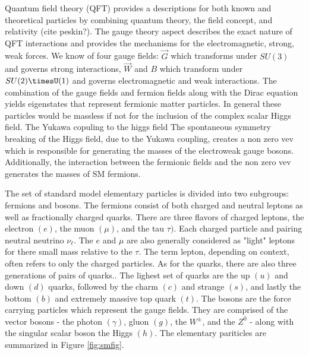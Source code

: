 Quantum field theory (QFT) provides a descriptions for both known and theoretical particles by combining quantum theory, the field concept, and relativity (cite peskin?). The gauge theory aspect describes the exact nature of QFT interactions and provides the mechanisms for the electromagnetic, strong, weak forces.  We know of four gauge fields:  $\vec{G}$ which transforms under $SU(3)$ and governs strong interactions, $\vec{W}$ and $B$ which transform under $SU(2)\timesU(1)$ and governs electromagnetic and weak interactions. The combination of the gauge fields and fermion fields along with the Dirac equation yields eigenstates that represent fermionic matter particles. In general these particles would be massless if not for the inclusion of the complex scalar Higgs field. The Yukawa copuling to the higgs field
The spontaneous symmetry breaking of the Higgs field, due to the Yukawa coupling, creates a non zero vev which is responsible for generating the masses of the electroweak gauge bosons. Additionally, the interaction between the fermionic fields and the non zero vev generates the masses of SM fermions.

The set of standard model elementary particles is divided into two subgroups: fermions and bosons.  The fermions consist of both charged and neutral leptons as well as fractionally charged quarks. There are three flavors of charged leptons, the electron $(e)$, the muon $(\mu)$, and the tau $\tau)$. Each charged particle and pairing neutral neutrino $\nu_\ell$. The $e$ and $\mu$ are also generally considered as "light" leptons for there small mass relative to the $\tau$. The term lepton, depending on context, often refers to only the charged particles. As for the quarks, there are also three generations of pairs of quarks.. The lighest set of quarks are the up $(u)$ and down $(d)$ quarks, followed by the charm $(c)$ and strange $(s)$, and lastly the bottom $(b)$ and extremely massive top quark $(t)$.  The bosons are the force carrying particles which represent the gauge fields. They are comprised of the vector bosons - the photon $(\gamma)$, gluon $(g)$, the $W^\pm$, and the $Z^0$ - along with the singular scalar boson the Higgs $(h)$. The elementary pariticles are summarized in Figure \ref{fig:smfig}.






